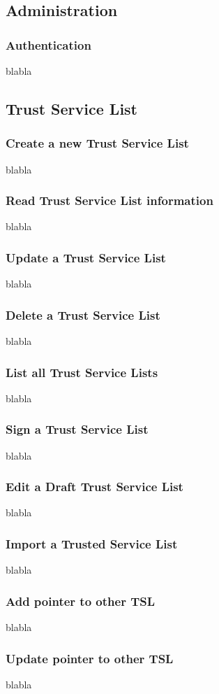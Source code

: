 \documentclass{tnreport}
\begin{document}
\subsection{Administration}
\subsubsection{Authentication}
blabla

\subsection{Trust Service List}
\subsubsection{Create a new Trust Service List}
blabla
\subsubsection{Read Trust Service List information}
blabla
\subsubsection{Update a Trust Service List}
blabla
\subsubsection{Delete a Trust Service List}
blabla
\subsubsection{List all Trust Service Lists}
blabla
\subsubsection{Sign a Trust Service List}
blabla
\subsubsection{Edit a Draft Trust Service List}
blabla
\subsubsection{Import a Trusted Service List}
blabla
\subsubsection{Add pointer to other TSL}
blabla
\subsubsection{Update pointer to other TSL}
blabla
\end{document}
